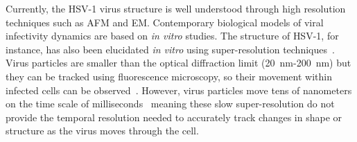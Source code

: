 Currently, the \gls{HSV}-1 virus structure is well understood through high resolution techniques such as \gls{AFM} and \gls{EM}.
Contemporary biological models of viral infectivity dynamics are based on \textit{in vitro} studies. %
The structure of \gls{HSV}-1, for instance, has also been elucidated \textit{in vitro} using super-resolution techniques~\cite{laine_structural_2015}.
Virus particles are smaller than the optical diffraction limit (\SI{20}{\nano\meter}-\SI{200}{\nano\meter})
but they can be tracked using fluorescence microscopy, so their movement within infected cells can be observed~\cite{pereira_hiv_2012}.
However, virus particles move tens of nanometers on the time scale of milliseconds~\cite{brandenburg_virus_2007} meaning these slow super-resolution do not provide the temporal resolution needed to accurately track changes in shape or structure as the virus moves through the cell.

%

